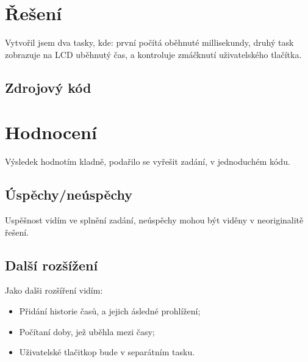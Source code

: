 \documentclass[10pt]{article}
\begin{document}
\section{Řešení}

Vytvořil jsem dva tasky, kde: první počítá oběhnuté millisekundy, druhý task zobrazuje na LCD uběhnutý čas, a kontroluje zmáčknutí uživatelského tlačítka.

\subsection{Zdrojový kód}



\section{Hodnocení}

Výsledek hodnotím kladně, podařilo se vyřešit zadání, v jednoduchém kódu.

\subsection{Úspěchy/neúspěchy}
Uspěšnost vidím ve splnění zadání, neúspěchy mohou být viděny v neoriginalitě řešení.

\subsection{Další rozšížení}
Jako dalši rozšíření vidím:
\begin{itemize}
    \item Přidání historie časů, a jejich ásledné prohlížení;
    \item Počítaní doby, jež uběhla mezi časy;
    \item Uživatelské tlačitkop bude v separátním tasku.
\end{itemize}
\end{document}
